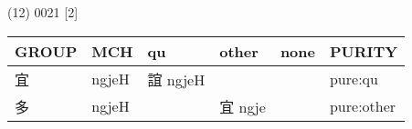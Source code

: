 \documentclass[14pt,a4paper]{scrartcl}
\begin{document}
(12) 0021 {[}2{]}

\begin{longtable}[c]{@{}llllll@{}}
\toprule
\begin{minipage}[b]{0.14\columnwidth}\raggedright\strut
GROUP
\strut\end{minipage} &
\begin{minipage}[b]{0.14\columnwidth}\raggedright\strut
MCH
\strut\end{minipage} &
\begin{minipage}[b]{0.14\columnwidth}\raggedright\strut
qu
\strut\end{minipage} &
\begin{minipage}[b]{0.14\columnwidth}\raggedright\strut
other
\strut\end{minipage} &
\begin{minipage}[b]{0.14\columnwidth}\raggedright\strut
none
\strut\end{minipage} &
\begin{minipage}[b]{0.14\columnwidth}\raggedright\strut
PURITY
\strut\end{minipage}\tabularnewline
\midrule
\endhead
\begin{minipage}[t]{0.14\columnwidth}\raggedright\strut
宜
\strut\end{minipage} &
\begin{minipage}[t]{0.14\columnwidth}\raggedright\strut
ngjeH
\strut\end{minipage} &
\begin{minipage}[t]{0.14\columnwidth}\raggedright\strut
誼 ngjeH
\strut\end{minipage} &
\begin{minipage}[t]{0.14\columnwidth}\raggedright\strut
\strut\end{minipage} &
\begin{minipage}[t]{0.14\columnwidth}\raggedright\strut
\strut\end{minipage} &
\begin{minipage}[t]{0.14\columnwidth}\raggedright\strut
pure:qu
\strut\end{minipage}\tabularnewline
\begin{minipage}[t]{0.14\columnwidth}\raggedright\strut
多
\strut\end{minipage} &
\begin{minipage}[t]{0.14\columnwidth}\raggedright\strut
ngjeH
\strut\end{minipage} &
\begin{minipage}[t]{0.14\columnwidth}\raggedright\strut
\strut\end{minipage} &
\begin{minipage}[t]{0.14\columnwidth}\raggedright\strut
宜 ngje
\strut\end{minipage} &
\begin{minipage}[t]{0.14\columnwidth}\raggedright\strut
\strut\end{minipage} &
\begin{minipage}[t]{0.14\columnwidth}\raggedright\strut
pure:other
\strut\end{minipage}\tabularnewline
\bottomrule
\end{longtable}
\end{document}

